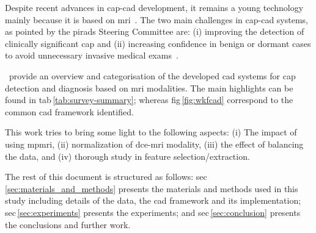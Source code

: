 \documentclass[num-refs]{wiley-article}
\begin{document}
Despite recent advances in \ac{cap}-\ac{cad} development, it remains a young
technology mainly because it is based on \ac{mri}~\cite{Hegde2013}.
%
The two main challenges in \ac{cap}-\ac{cad} systems, as pointed by the
\ac{pirads} Steering Committee are: (i) improving the detection of clinically
significant \ac{cap} and (ii) increasing confidence in benign or dormant cases
to avoid unnecessary invasive medical exams~\citep{weinreb2016pi}.

\citeauthor{lemaitre2015computer}\,\cite{lemaitre2015computer} provide an
overview and categorisation of the developed \acs{cad} systems for \ac{cap}
detection and diagnosis based on \ac{mri} modalities. The main highlights can be
found in \acs{tab}\,\ref{tab:survey-summary}; whereas
\acs{fig}\,\ref{fig:wkfcad} correspond to the common \ac{cad} framework
identified.%

This work tries to bring some light to the following aspects: (i) The impact of
using \ac{mpmri}, (ii) normalization of \ac{dce}-\ac{mri} modality, (iii) the effect
of balancing the data, and (iv) thorough study in feature selection/extraction.

The rest of this document is structured as follows:
\acs{sec}\,\ref{sec:materials_and_methods} presents the materials and methods used in
this study including details of the data, the \ac{cad} framework and its
implementation; \acs{sec}\,\ref{sec:experiments} presents the experiments; and
\ac{sec}\,\ref{sec:conclusion} presents the conclusions and further work.



\end{document}

